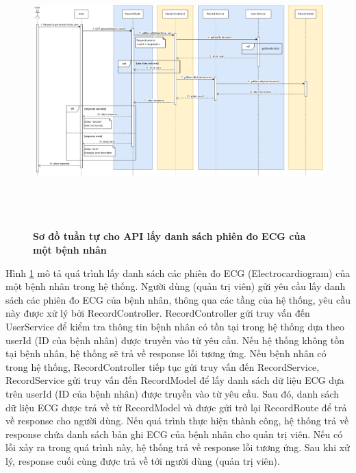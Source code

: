 \begin{figure}[H]
  \centering
  \includegraphics[width=16cm,height=10.5cm]{Images/sequence_api/getRecordsByUser.png}
  \caption[Sơ đồ tuần tự cho API lấy danh sách phiên đo ECG của một bệnh nhân ]{\bfseries \fontsize{12pt}{0pt}
  \selectfont Sơ đồ tuần tự cho API lấy danh sách phiên đo ECG của một bệnh nhân }
  \label{getRecordsByUser} %
\end{figure}
Hình \ref{getRecordsByUser} mô tả quá trình lấy danh sách các phiên đo ECG (Electrocardiogram) của một bệnh nhân trong hệ thống. Người dùng (quản trị viên) gửi yêu cầu lấy danh sách các phiên đo ECG của bệnh nhân, thông qua các tầng của hệ thống, 
yêu cầu này được xử lý bởi RecordController. RecordController gửi truy vấn đến UserService để kiểm tra thông tin bệnh nhân có tồn tại trong hệ thống dựa theo userId (ID của bệnh nhân) được truyền vào từ yêu cầu. Nếu hệ thống không tồn tại bệnh nhân, hệ thống sẽ
trả về response lỗi tương ứng. Nếu bệnh nhân có trong hệ thống, RecordController tiếp tục gửi truy vấn đến RecordService, RecordService gửi truy vấn đến RecordModel để lấy danh sách dữ liệu ECG dựa trên userId (ID của bệnh nhân) được truyền vào từ yêu cầu. 
Sau đó, danh sách dữ liệu ECG được trả về từ RecordModel và được gửi trở lại RecordRoute để trả về response cho người dùng. Nếu quá trình thực hiện thành công, hệ thống trả về response chứa danh sách bản ghi ECG của bệnh nhân cho quản trị viên. Nếu có lỗi xảy ra
 trong quá trình này, hệ thống trả về response lỗi tương ứng. Sau khi xử lý, response cuối cùng được trả về tới người dùng (quản trị viên).

